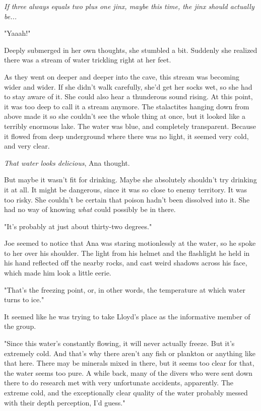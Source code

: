\documentclass[
]{article}
\begin{document}
\emph{If three always equals two plus one jinx, maybe this time, the
jinx should actually be...}

"Yaaah!"

Deeply submerged in her own thoughts, she stumbled a bit. Suddenly she
realized there was a stream of water trickling right at her feet.

As they went on deeper and deeper into the cave, this stream was
becoming wider and wider. If she didn't walk carefully, she'd get her
socks wet, so she had to stay aware of it. She could also hear a
thunderous sound rising. At this point, it was too deep to call it a
stream anymore. The stalactites hanging down from above made it so she
couldn't see the whole thing at once, but it looked like a terribly
enormous lake. The water was blue, and completely transparent. Because
it flowed from deep underground where there was no light, it seemed very
cold, and very clear.

\emph{That water looks delicious}, Ana thought.

But maybe it wasn't fit for drinking. Maybe she absolutely shouldn't try
drinking it at all. It might be dangerous, since it was so close to
enemy territory. It was too risky. She couldn't be certain that poison
hadn't been dissolved into it. She had no way of knowing \emph{what}
could possibly be in there.

"It's probably at just about thirty-two degrees."

Joe seemed to notice that Ana was staring motionlessly at the water, so
he spoke to her over his shoulder. The light from his helmet and the
flashlight he held in his hand reflected off the nearby rocks, and cast
weird shadows across his face, which made him look a little eerie.

"That's the freezing point, or, in other words, the temperature at which
water turns to ice."

It seemed like he was trying to take Lloyd's place as the informative
member of the group.

"Since this water's constantly flowing, it will never actually freeze.
But it's extremely cold. And that's why there aren't any fish or
plankton or anything like that here. There may be minerals mixed in
there, but it seems too clear for that, the water seems too pure. A
while back, many of the divers who were sent down there to do research
met with very unfortunate accidents, apparently. The extreme cold, and
the exceptionally clear quality of the water probably messed with their
depth perception, I'd guess."
\end{document}

